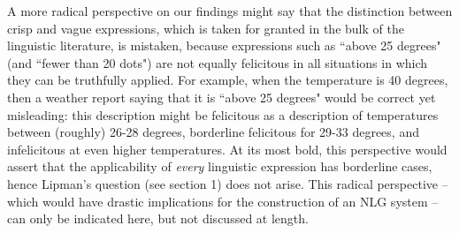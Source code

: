 \documentclass[%
man,		%
floatsintext,%
apacite%
]{apa6}
\begin{document}
A more radical perspective on our findings might say that the distinction between crisp and vague expressions, which is taken for granted in the bulk of the linguistic literature, is mistaken, because expressions such as ``above 25 degrees" (and ``fewer than 20 dots") are not equally felicitous in all situations in which they can be truthfully applied. For example, when the temperature is 40 degrees, then a weather report saying that it is ``above 25 degrees" would be correct yet misleading: this description might be felicitous as a description of temperatures between (roughly) 26-28 degrees, borderline felicitous for 29-33 degrees, and infelicitous at even higher temperatures. At its most bold, this perspective %
would assert that the applicability of {\em every} linguistic expression has borderline cases, hence Lipman's question (see section 1) does not arise. This radical perspective -- which would have drastic implications for the construction of an NLG system -- can only be indicated here, but not discussed at length.

\setcounter{secnumdepth}{0}

\end{document}
